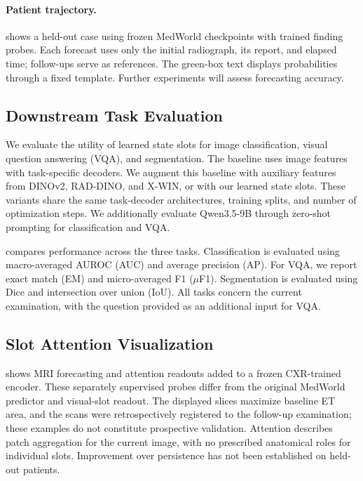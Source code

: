\paragraph{Patient trajectory.}
\label{sec:patient_trajectory}

 shows a held-out case using frozen
MedWorld checkpoints with trained finding probes. Each forecast uses only the
initial radiograph, its report, and elapsed time; follow-ups serve as references.
The green-box text displays probabilities through a fixed template.
Further experiments will assess forecasting accuracy.

\subsection{Downstream Task Evaluation}

We evaluate the utility of learned state slots for image classification, visual question answering (VQA), and segmentation. The baseline uses image features with task-specific decoders. We augment this baseline with auxiliary features from DINOv2, RAD-DINO, and X-WIN, or with our learned state slots. These variants share the same task-decoder architectures, training splits, and number of optimization steps. We additionally evaluate Qwen3.5-9B through zero-shot prompting for classification and VQA.

 compares performance across the three tasks. Classification is evaluated using macro-averaged AUROC (AUC) and average precision (AP). For VQA, we report exact match (EM) and micro-averaged F1 ($\mu$F1). Segmentation is evaluated using Dice and intersection over union (IoU). All tasks concern the current examination, with the question provided as an additional input for VQA.

\subsection{Slot Attention Visualization}
\label{sec:attention_visualization}

 shows MRI forecasting and attention
readouts added to a frozen CXR-trained encoder. These separately supervised
probes differ from the original MedWorld predictor and visual-slot readout.
The displayed slices maximize baseline ET area, and the scans were
retrospectively registered to the follow-up examination; these examples do
not constitute prospective validation. Attention describes patch aggregation
for the current image, with no prescribed anatomical roles for individual
slots. Improvement over persistence has not been established on held-out
patients.

